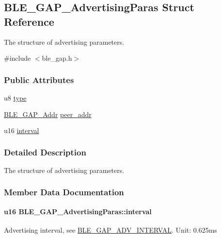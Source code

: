 \hypertarget{struct_b_l_e___g_a_p___advertising_paras}{}\subsection{B\+L\+E\+\_\+\+G\+A\+P\+\_\+\+Advertising\+Paras Struct Reference}
\label{struct_b_l_e___g_a_p___advertising_paras}


The structure of advertising parameters.  




{\ttfamily \#include $<$ble\+\_\+gap.\+h$>$}

\subsubsection*{Public Attributes}
\begin{DoxyCompactItemize}
\item 
u8 \hyperlink{struct_b_l_e___g_a_p___advertising_paras_a3501bbd35324ea30bc78b2c0465ed087}{type}
\item 
\hyperlink{struct_b_l_e___g_a_p___addr}{B\+L\+E\+\_\+\+G\+A\+P\+\_\+\+Addr} \hyperlink{struct_b_l_e___g_a_p___advertising_paras_aa29d4a5b0f7f58531b2eacbe2c31987a}{peer\+\_\+addr}
\item 
u16 \hyperlink{struct_b_l_e___g_a_p___advertising_paras_a4dafddd1b36f2d9fe87875e756552e4c}{interval}
\end{DoxyCompactItemize}


\subsubsection{Detailed Description}
The structure of advertising parameters. 

\subsubsection{Member Data Documentation}
\paragraph[{\texorpdfstring{interval}{interval}}]{\setlength{\rightskip}{0pt plus 5cm}u16 B\+L\+E\+\_\+\+G\+A\+P\+\_\+\+Advertising\+Paras\+::interval}\hypertarget{struct_b_l_e___g_a_p___advertising_paras_a4dafddd1b36f2d9fe87875e756552e4c}{}\label{struct_b_l_e___g_a_p___advertising_paras_a4dafddd1b36f2d9fe87875e756552e4c}
Advertising interval, see \hyperlink{group___b_l_e___g_a_p___a_d_v___i_n_t_e_r_v_a_l}{B\+L\+E\+\_\+\+G\+A\+P\+\_\+\+A\+D\+V\+\_\+\+I\+N\+T\+E\+R\+V\+AL}. Unit\+: 0.\+625ms 
